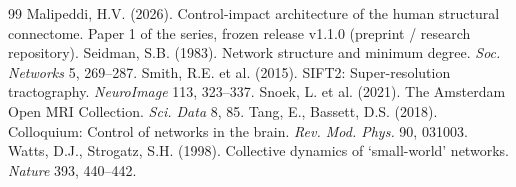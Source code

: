 \documentclass[11pt,a4paper]{article}
\begin{document}
\begin{thebibliography}{99}
 Malipeddi, H.V. (2026). Control-impact architecture of the human structural connectome. Paper 1 of the series, frozen release v1.1.0 (preprint / research repository).
 Seidman, S.B. (1983). Network structure and minimum degree. \emph{Soc. Networks} 5, 269--287.
 Smith, R.E. et al. (2015). SIFT2: Super-resolution tractography. \emph{NeuroImage} 113, 323--337.
 Snoek, L. et al. (2021). The Amsterdam Open MRI Collection. \emph{Sci. Data} 8, 85.
 Tang, E., Bassett, D.S. (2018). Colloquium: Control of networks in the brain. \emph{Rev. Mod. Phys.} 90, 031003.
 Watts, D.J., Strogatz, S.H. (1998). Collective dynamics of `small-world' networks. \emph{Nature} 393, 440--442.
\end{thebibliography}
\end{document}
